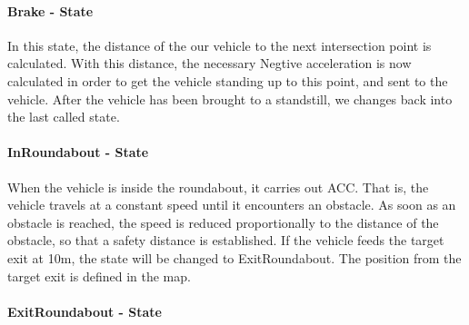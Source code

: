 \documentclass[11pt,oneside,openright]{mpreport}
\begin{document}
\paragraph{Brake - State}
In this state, the distance of the our vehicle to the next intersection point is calculated.
With this distance, the necessary Negtive acceleration is now calculated in order to get the vehicle standing up to this point,
and sent to the vehicle. After the vehicle has been brought to a standstill, we changes back into the last called state.

\paragraph{InRoundabout - State}
When the vehicle is inside the roundabout, it carries out \ac {ACC}. That is, the vehicle travels at a constant speed until it encounters an obstacle. 
As soon as an obstacle is reached, the speed is reduced proportionally to the distance of the obstacle, so that a safety distance is established.
If the vehicle feeds the target exit at 10m, the state will be changed to ExitRoundabout. The position from the target exit is defined in the map.




\paragraph{ExitRoundabout - State}
\end{document}
